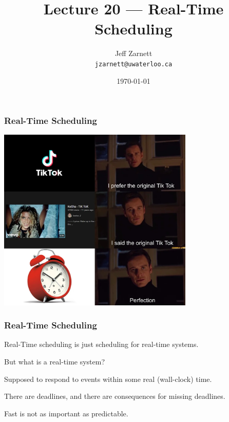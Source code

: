 

\title{Lecture 20 --- Real-Time Scheduling}

\author{Jeff Zarnett \\ \small \texttt{jzarnett@uwaterloo.ca}}
\date{\today}




\begin{frame}
  \titlepage

 \end{frame}
 
\begin{frame}
\frametitle{Real-Time Scheduling}


\begin{center}
	\includegraphics[width=0.7\textwidth]{images/tiktok.jpg}
\end{center}

\end{frame}

\begin{frame}
\frametitle{Real-Time Scheduling}

Real-Time scheduling is just scheduling for real-time systems.

But what is a real-time system?

Supposed to respond to events within some real (wall-clock) time. 

There are deadlines, and there are consequences for missing deadlines. 

Fast is not as important as predictable.

\end{frame}

